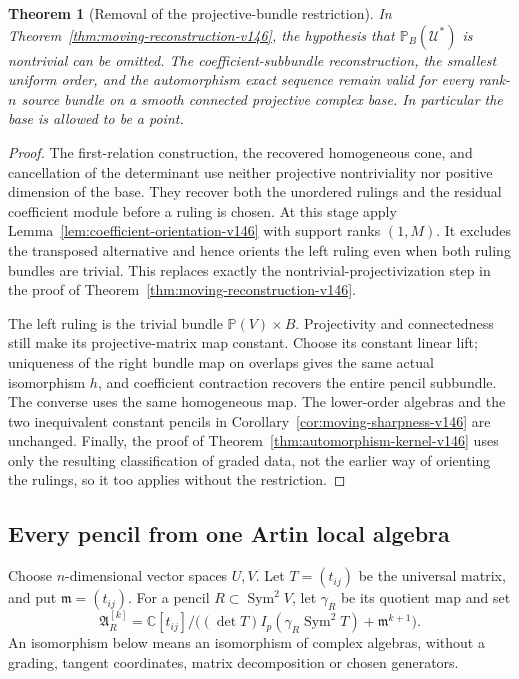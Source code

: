 \documentclass[11pt,reqno]{amsart}
\numberwithin{equation}{section}
\newtheorem{theorem}{Theorem}[section]
\theoremstyle{definition}\newtheorem{definition}[theorem]{Definition}
\theoremstyle{remark}\newtheorem{remark}[theorem]{Remark}
\newcommand{\C}{\mathbb C}\newcommand{\Q}{\mathbb Q}
\newcommand{\Pj}{\mathbb P}\newcommand{\A}{\mathbb A}
\DeclareMathOperator{\Sym}{Sym}\DeclareMathOperator{\Gr}{Gr}
\begin{document}
\begin{theorem}[Removal of the projective-bundle restriction]
\label{thm:unrestricted-moving-v146}
In Theorem~\ref{thm:moving-reconstruction-v146}, the hypothesis
that \(\Pj_B(\mathcal U^*)\) is nontrivial can be omitted.  The
coefficient-sub\-bundle reconstruction, the smallest uniform order,
and the automorphism exact sequence remain valid for every
rank-\(n\) source bundle on a smooth connected projective complex
base.  In particular the base is allowed to be a point.
\end{theorem}
\begin{proof}
The first-relation construction, the recovered homogeneous cone,
and cancellation of the determinant use neither projective
nontriviality nor positive dimension of the base.  They recover
both the unordered rulings and the residual coefficient module
before a ruling is chosen.  At this stage apply
Lemma~\ref{lem:coefficient-orientation-v146} with support ranks
\((1,M)\).  It excludes the transposed alternative and hence
orients the left ruling even when both ruling bundles are trivial.
This replaces exactly the nontrivial-projectivization step in the
proof of Theorem~\ref{thm:moving-reconstruction-v146}.

The left ruling is the trivial bundle \(\Pj(V)\times B\).
Projectivity and connectedness still make its projective-matrix
map constant.  Choose its constant linear lift; uniqueness of the
right bundle map on overlaps gives the same actual isomorphism
\(h\), and coefficient contraction recovers the entire pencil
subbundle.  The converse uses the same homogeneous map.  The
lower-order algebras and the two inequivalent constant pencils in
Corollary~\ref{cor:moving-sharpness-v146} are unchanged.  Finally,
the proof of Theorem~\ref{thm:automorphism-kernel-v146} uses only
the resulting classification of graded data, not the earlier way
of orienting the rulings, so it too applies without the restriction.
\end{proof}

\subsection{Every pencil from one Artin local algebra}
Choose \(n\)-dimensional vector spaces \(U,V\).  Let
\(T=(t_{ij})\) be the universal matrix, and put
\(\mathfrak m=(t_{ij})\).  For a pencil
\(R\subset\Sym^2V\), let \(\gamma_R\) be its quotient map and set
\begin{equation}\label{eq:local-algebra-v146}
 \mathfrak A_R^{[k]}=
 \C[t_{ij}]/\bigl((\det T)I_p(\gamma_R\Sym^2T)
                                      +\mathfrak m^{k+1}\bigr).
\end{equation}
An isomorphism below means an isomorphism of complex algebras,
without a grading, tangent coordinates, matrix decomposition or
chosen generators.
\end{document}
